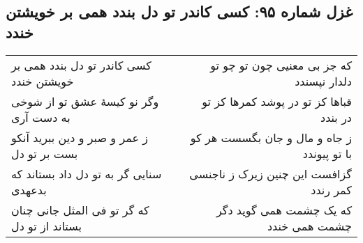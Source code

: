 \begin{center}
\section*{غزل شماره ۹۵: کسی کاندر تو دل بندد همی بر خویشتن خندد}
\label{sec:095}
\begin{longtable}{l p{0.5cm} r}
کسی کاندر تو دل بندد همی بر خویشتن خندد
&&
که جز بی معنیی چون تو چو تو دلدار نپسندد
\\
وگر نو کیسهٔ عشق تو از شوخی به دست آری
&&
قباها کز تو در پوشد کمرها کز تو در بندد
\\
ز عمر و صبر و دین ببرید آنکو بست بر تو دل
&&
ز جاه و مال و جان بگسست هر کو با تو پیوندد
\\
سنایی گر به تو دل داد بستاند که بدعهدی
&&
گزافست این چنین زیرک ز ناجنسی کمر رندد
\\
که گر تو فی المثل جانی چنان بستاند از تو دل
&&
که یک چشمت همی گوید دگر چشمت همی خندد
\\
\end{longtable}
\end{center}
